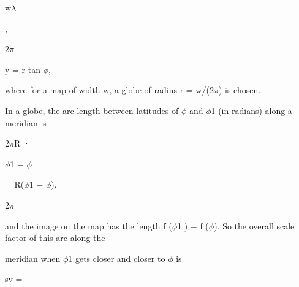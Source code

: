 \documentclass[a4paper,portrait,12pt]{article}
\begin{document}
\begin{flushleft}
w$\lambda$
\end{flushleft}


,


\begin{flushleft}
2$\pi$
\end{flushleft}





\begin{flushleft}
y = r tan $\phi$,
\end{flushleft}





\begin{flushleft}
where for a map of width w, a globe of radius r = w/(2$\pi$) is chosen.
\end{flushleft}


\begin{flushleft}
In a globe, the arc length between latitudes of $\phi$ and $\phi$1 (in radians) along a meridian is
\end{flushleft}


\begin{flushleft}
2$\pi$R ·
\end{flushleft}





\begin{flushleft}
$\phi$1 $-$ $\phi$
\end{flushleft}


\begin{flushleft}
= R($\phi$1 $-$ $\phi$),
\end{flushleft}


\begin{flushleft}
2$\pi$
\end{flushleft}





\begin{flushleft}
and the image on the map has the length f ($\phi$1 ) $-$ f ($\phi$). So the overall scale factor of this arc along the
\end{flushleft}


\begin{flushleft}
meridian when $\phi$1 gets closer and closer to $\phi$ is
\end{flushleft}


\begin{flushleft}
sv =
\end{flushleft}
\end{document}

